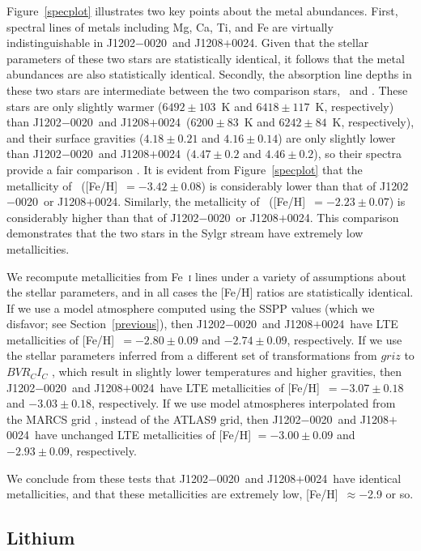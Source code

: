 \documentclass[twocolumn,tighten]{aastex62}
\newcommand{\gsix}{\object[G 64-12]{G~64-12}}
\newcommand{\hdeight}{\object[HD 84937]{HD~84937}}
\newcommand{\jtwo}{J1202$-$0020}
\newcommand{\jeight}{J1208$+$0024}
\begin{document}
Figure~\ref{specplot} illustrates two key points about the
metal abundances.
First, spectral lines of metals including Mg, Ca, Ti, and Fe
are virtually indistinguishable in \jtwo\ and \jeight.
Given that the stellar parameters of these two stars are 
statistically identical, it follows that the
metal abundances are also statistically identical.
Secondly, the absorption line depths in these two stars are
intermediate between the two comparison stars,
\gsix\ and \hdeight.
These stars are only slightly warmer 
($6492 \pm 103$~K and $6418 \pm 117$~K, respectively)
than \jtwo\ and \jeight\
($6200 \pm 83$~K and $6242 \pm 84$~K, respectively),
and their surface gravities 
($4.18 \pm 0.21$ and $4.16 \pm 0.14$)
are only slightly lower than \jtwo\ and \jeight\
($4.47 \pm 0.2$ and $4.46 \pm 0.2$),
so their spectra provide a fair comparison
\citep{roederer18b}.
It is evident from Figure~\ref{specplot} that 
the metallicity of \gsix\
([Fe/H]~$= -3.42 \pm 0.08$) is considerably 
lower than that of
\jtwo \ or \jeight.
Similarly, the metallicity of \hdeight\
([Fe/H]~$= -2.23 \pm 0.07$) is considerably
higher than that of \jtwo\ or \jeight.
This comparison demonstrates that
the two stars in the Sylgr stream have 
extremely low metallicities.

We recompute metallicities from Fe~\textsc{i} lines
under a variety of assumptions about the stellar parameters,
and in all cases the [Fe/H] ratios are
statistically identical.
If we use a model atmosphere computed using
the SSPP values 
(which we disfavor; see Section~\ref{previous}),
then \jtwo\ and \jeight\ have LTE metallicities of
[Fe/H]~$= -2.80 \pm 0.09$ and
$-2.74 \pm 0.09$, respectively.
If we use the stellar parameters inferred from a different
set of transformations from $griz$ to $BVR_{C}I_{C}$ 
\citep{jester05},
which result in slightly lower temperatures and higher gravities,
then \jtwo\ and \jeight\ have LTE metallicities of
[Fe/H]~$= -3.07 \pm 0.18$ and
$-3.03 \pm 0.18$, respectively.
If we use model atmospheres interpolated from the
MARCS grid \citep{gustafsson08},
instead of the ATLAS9 grid,
then \jtwo\ and \jeight\ have unchanged LTE metallicities of
[Fe/H] $= -3.00 \pm 0.09$ and
$-2.93 \pm 0.09$, respectively.

We conclude from these tests 
that \jtwo\ and \jeight\ have
identical metallicities, 
and that these metallicities are extremely low,
[Fe/H]~$\approx -$2.9 or so.


\subsection{Lithium}
\label{lithium}
\end{document}
